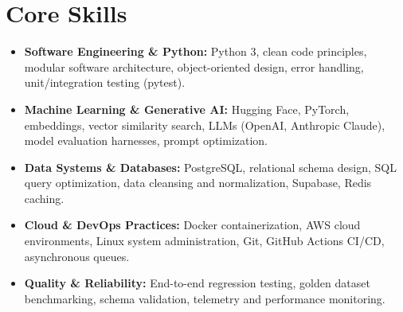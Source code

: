 \documentclass[a4paper,10pt]{article}
\begin{document}
\section{Core Skills}
\begin{itemize}
 \item \textbf{Software Engineering \& Python:} Python 3, clean code principles, modular software architecture, object-oriented design, error handling, unit/integration testing (pytest).
 \item \textbf{Machine Learning \& Generative AI:} Hugging Face, PyTorch, embeddings, vector similarity search, LLMs (OpenAI, Anthropic Claude), model evaluation harnesses, prompt optimization.
 \item \textbf{Data Systems \& Databases:} PostgreSQL, relational schema design, SQL query optimization, data cleansing and normalization, Supabase, Redis caching.
 \item \textbf{Cloud \& DevOps Practices:} Docker containerization, AWS cloud environments, Linux system administration, Git, GitHub Actions CI/CD, asynchronous queues.
 \item \textbf{Quality \& Reliability:} End-to-end regression testing, golden dataset benchmarking, schema validation, telemetry and performance monitoring.
\end{itemize}
\end{document}
